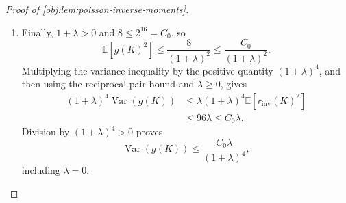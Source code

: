 \begin{proof}[Proof of \cref{obj:lem:poisson-inverse-moments}]
\begin{enumerate}
\item Finally, \(1+\lambda>0\) and \(8\le2^{16}=C_0\), so
\[
\mathbb E[g(K)^2]
\le\frac8{(1+\lambda)^2}
\le\frac{C_0}{(1+\lambda)^2}.
\]
Multiplying the variance inequality by the positive quantity \((1+\lambda)^4\), and then using the reciprocal-pair bound and \(\lambda\ge0\), gives
\[
\begin{aligned}
(1+\lambda)^4\operatorname{Var}(g(K))
&\le\lambda(1+\lambda)^4\mathbb E[r_{\mathrm{inv}}(K)^2]\\
&\le96\lambda
\le C_0\lambda.
\end{aligned}
\]
Division by \((1+\lambda)^4>0\) proves
\[
\operatorname{Var}(g(K))
\le\frac{C_0\lambda}{(1+\lambda)^4},
\]
including \(\lambda=0\). %
\end{enumerate}
\end{proof}
